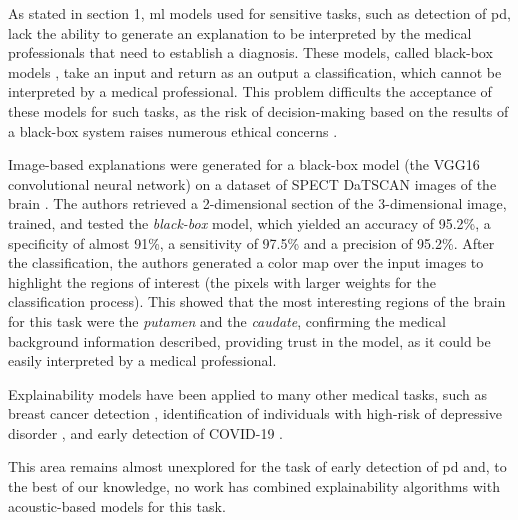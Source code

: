 As stated in section 1, \gls{ml} models used for sensitive tasks, such as detection of \gls{pd}, lack the ability to generate an explanation to be interpreted by the medical professionals that need to establish a diagnosis. These models, called black-box models \cite{explainable_ai_systems}, take an input and return as an output a classification, which cannot be interpreted by a medical professional. This problem difficults the acceptance of these models for such tasks, as the risk of decision-making based on the results of a black-box system raises numerous ethical concerns \cite{ethical_black_box_decision}.

Image-based explanations were generated for a black-box model (the VGG16 convolutional neural network) on a dataset of SPECT DaTSCAN images of the brain \cite{LIME_explainability}. The authors retrieved a 2-dimensional section of the 3-dimensional image, trained, and tested the \textit{black-box} model, which yielded an accuracy of 95.2\%, a specificity of almost 91\%, a sensitivity of 97.5\% and a precision of 95.2\%. After the classification, the authors generated a color map over the input images to highlight the regions of interest (the pixels with larger weights for the classification process). This showed that the most interesting regions of the brain for this task were the \textit{putamen} and the \textit{caudate}, confirming the medical background information described, providing trust in the model, as it could be easily interpreted by a medical professional.

Explainability models have been applied to many other medical tasks, such as breast cancer detection \cite{lime_breast_cancer}, identification of individuals with high-risk of depressive disorder \cite{lime_depression}, and early detection of COVID-19 \cite{lime_covid}. 

This area remains almost unexplored for the task of early detection of \gls{pd} and, to the best of our knowledge, no work has combined explainability algorithms with acoustic-based models for this task.



